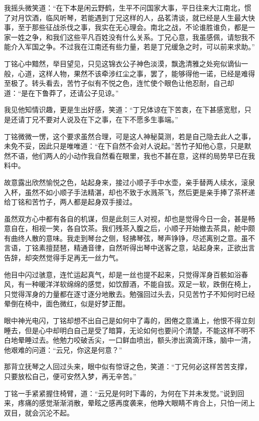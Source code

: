 我摇头微笑道：“在下本是闲云野鹤，生平不问国家大事，平日往来大江南北，惯了对月饮酒，临风听琴，若能遇到丁兄这样的人，品茗清谈，就已经是人生最大快事，至于那些征战杀伐之事，我实在无心理会。南北之战，不论谁胜谁负，都是一家一姓之争，和我们这些平凡百姓没有什么关系。丁兄心意，我虽感佩，请恕我不能介入军国之争。不过我在江南还有些力量，若是丁兄缓急之时，可以前来求助。”

丁铭心中黯然，举目望见，只见这锦衣公子神色淡漠，飘逸清雅之处宛似谪仙一般，心道，这样人物，果然不该牵涉红尘之事，罢了，能够得他一诺，已经是难得至极了。转头看去，苦竹子似有不悦之色，连忙使个眼色让他忍耐，自己却道：“是在下鲁莽了，还请公子见谅。”

我见他知情识趣，更是生出好感，笑道：“丁兄体谅在下苦衷，在下甚感宽慰，只是还请丁兄不要对人说及在下之事，在下不愿多生事端。”

丁铭微微一愣，这个要求虽然合理，可是这人神秘莫测，若是自己隐去此人之事，未免不妥，因此只是唯唯道：“在下自然不会对人说起。”苦竹子知他心意，只是默然不语，他们两人的小动作我自然看在眼里，我也不甚在意，这样的局势早已在我料中。

故意露出欣然愉悦之色，站起身来，接过小顺子手中水壶，亲手替两人续水，滚泉入杯，虽然不如小顺子手法精湛，却也不致于水溅茶飞，然后更是亲手捧了茶杯递给丁铭和苦竹子，两人都是起身双手接过。

虽然双方心中都有各自的机谋，但是此刻三人对视，却也是觉得今日一会，甚是畅意自在，相视一笑，各自饮茶。我们残茶入腹之后，小顺子开始撤去茶具，舱中颇有曲终人散的意味。我走到琴台之侧，轻拂琴弦，琴声铮铮，尽述离别之意。虽不言语，丁铭素擅琵琶，精通音律，自然听得出琴中送客之意，站起身来，正欲出言告辞，却突然觉得手足再无一丝力气。

他目中闪过骇意，连忙运起真气，却是一丝也提不起来，只觉得浑身百骸如浴春风，有一种暖洋洋软绵绵的感觉，如饮醇酒，不能自拔。双足一软，跌倒在椅上，只觉得浑身的力量都在逐寸逐分地散去。勉强回过头去，只见苦竹子不知何时已经晕倒在椅中，面色微红，似是好梦正酣。

眼中神光电闪，丁铭却想不出自己是如何中了毒的，困倦之意涌上，他恨不得立刻睡去，但是心中却明白自己是受了暗算，无论如何也要问个清楚，不能这样不明不白地晕睡过去。他勉力咬破舌尖，一口鲜血喷出，额头渗出滴滴汗珠，脑中一清，他艰难的问道：“云兄，你这是何意？”

那背立抚琴之人回过头来，眼中似有惊讶之色，笑道：“丁兄何必这样苦苦支撑，只要放松自己，便可安然入梦，再无辛苦。”

丁铭一手紧紧握住椅臂，道：“云兄是何时下毒的，为何在下并未发觉。”说到回来，疼痛的感觉渐渐消散，晕眩之感再度袭来，他睁大眼睛不肯合上，只怕一闭上双目，就会沉沦不起。

